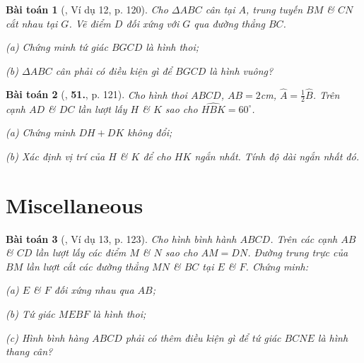 \documentclass{article}
\numberwithin{equation}{section}
\newtheorem{baitoan}{Bài toán}[section]
\begin{document}
\begin{baitoan}[\cite{Tuyen_Toan_8}, Ví dụ 12, p. 120]
	Cho $\Delta ABC$ cân tại $A$, trung tuyến $BM$ \& $CN$ cắt nhau tại $G$. Vẽ điểm $D$ đối xứng với $G$ qua đường thẳng $BC$.
	\begin{enumerate*}
		\item[(a)] Chứng minh tứ giác $BGCD$ là hình thoi;
		\item[(b)] $\Delta ABC$ cân phải có điều kiện gì để $BGCD$ là hình vuông?
	\end{enumerate*}
\end{baitoan}

\begin{baitoan}[\cite{Tuyen_Toan_8}, \textbf{51.}, p. 121]
	Cho hình thoi $ABCD$, $AB = 2$\emph{cm}, $\widehat{A} = \frac{1}{2}\widehat{B}$. Trên cạnh $AD$ \& $DC$ lần lượt lấy $H$ \& $K$ sao cho $\widehat{HBK} = 60^\circ$.
	\begin{enumerate*}
		\item[(a)] Chứng minh $DH + DK$ không đổi;
		\item[(b)] Xác định vị trí của $H$ \& $K$ để cho $HK$ ngắn nhất. Tính độ dài ngắn nhất đó.
	\end{enumerate*}
\end{baitoan}

\section{Miscellaneous}

\begin{baitoan}[\cite{Tuyen_Toan_8}, Ví dụ 13, p. 123]
	Cho hình bình hành $ABCD$. Trên các cạnh $AB$ \& $CD$ lần lượt lấy các điểm $M$ \& $N$ sao cho $AM = DN$. Đường trung trực của $BM$ lần lượt cắt các đường thẳng $MN$ \& $BC$ tại $E$ \& $F$. Chứng minh:
	\begin{enumerate*}
		\item[(a)] $E$ \& $F$ đối xứng nhau qua $AB$;
		\item[(b)] Tứ giác $MEBF$ là hình thoi;
		\item[(c)] Hình bình hàng $ABCD$ phải có thêm điều kiện gì để tứ giác $BCNE$ là hình thang cân?
	\end{enumerate*}
\end{baitoan}


\printbibliography[heading=bibintoc]
	
\end{document}

